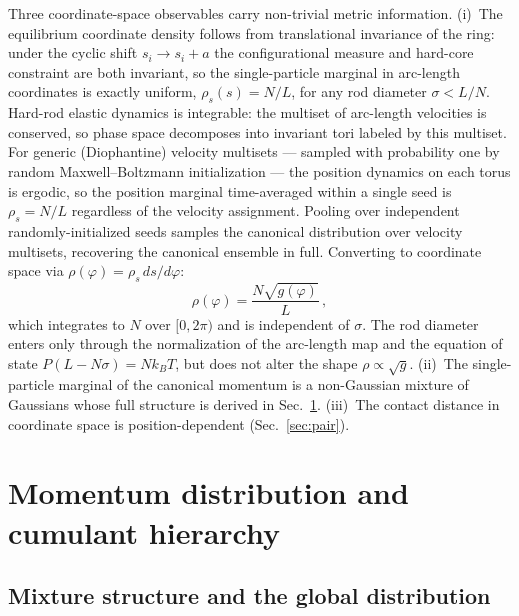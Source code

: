 \documentclass[aps,pre,twocolumn,superscriptaddress,longbibliography,floatfix]{revtex4-2}
\begin{document}
Three coordinate-space observables carry non-trivial metric information.
(i)~The equilibrium coordinate density follows from translational invariance of the ring:
under the cyclic shift $s_i\to s_i+a$ the configurational measure and hard-core constraint
are both invariant, so the single-particle marginal in arc-length coordinates is exactly
uniform, $\rho_s(s)=N/L$, for any rod diameter $\sigma<L/N$.
Hard-rod elastic dynamics is integrable: the multiset of arc-length velocities is conserved,
so phase space decomposes into invariant tori labeled by this multiset.
For generic (Diophantine) velocity multisets — sampled with probability one by random
Maxwell--Boltzmann initialization — the position dynamics on each torus is ergodic, so
the position marginal time-averaged within a single seed is $\rho_s=N/L$ regardless of
the velocity assignment.
Pooling over independent randomly-initialized seeds samples the canonical distribution
over velocity multisets, recovering the canonical ensemble in full.
Converting to coordinate space via $\rho(\varphi)=\rho_s\,ds/d\varphi$:
\begin{equation}
  \rho(\varphi) = \frac{N\sqrt{g(\varphi)}}{L}\,,
  \label{eq:density}
\end{equation}
which integrates to $N$ over $[0,2\pi)$ and is independent of $\sigma$.
The rod diameter enters only through the normalization of the arc-length map
and the equation of state $P(L-N\sigma)=Nk_BT$, but does not alter the
shape $\rho\propto\sqrt{g}$.
(ii)~The single-particle marginal of the canonical momentum is a non-Gaussian mixture of
Gaussians whose full structure is derived in Sec.~\ref{sec:superstat}.
(iii)~The contact distance in coordinate space is position-dependent (Sec.~\ref{sec:pair}).

\section{Momentum distribution and cumulant hierarchy}
\label{sec:superstat}

\subsection{Mixture structure and the global distribution}
\end{document}
